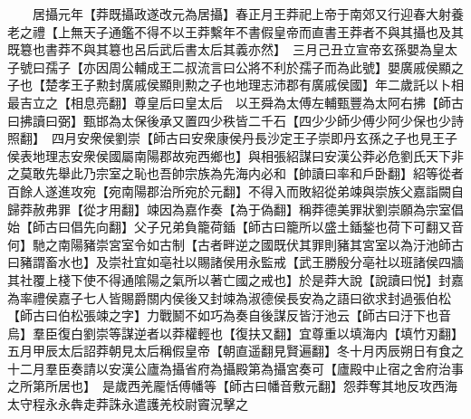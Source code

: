 　　居攝元年【莽既攝政遂改元為居攝】春正月王莽祀上帝于南郊又行迎春大射養老之禮【上無天子通鑑不得不以王莽繫年不書假皇帝而直書王莽者不與其攝也及其既簒也書莽不與其簒也呂后武后書太后其義亦然】　三月己丑立宣帝玄孫嬰為皇太子號曰孺子【亦因周公輔成王二叔流言曰公將不利於孺子而為此號】嬰廣戚侯顯之子也【楚孝王子勲封廣戚侯顯則勲之子也地理志沛郡有廣戚侯國】年二歲託以卜相最吉立之【相息亮翻】尊皇后曰皇太后　以王舜為太傅左輔甄豐為太阿右拂【師古曰拂讀曰弼】甄邯為太保後承又置四少秩皆二千石【四少少師少傅少阿少保也少詩照翻】　四月安衆侯劉崇【師古曰安衆康侯丹長沙定王子崇即丹玄孫之子也見王子侯表地理志安衆侯國屬南陽郡故宛西鄉也】與相張紹謀曰安漢公莽必危劉氏天下非之莫敢先舉此乃宗室之恥也吾帥宗族為先海内必和【帥讀曰率和戶卧翻】紹等從者百餘人遂進攻宛【宛南陽郡治所宛於元翻】不得入而敗紹從弟竦與崇族父嘉詣闕自歸莽赦弗罪【從才用翻】竦因為嘉作奏【為于偽翻】稱莽德美罪狀劉崇願為宗室倡始【師古曰倡先向翻】父子兄弟負籠荷鍤【師古曰籠所以盛土鍤鍫也荷下可翻又音何】馳之南陽豬崇宮室令如古制【古者畔逆之國既伏其罪則豬其宮室以為汙池師古曰豬謂畜水也】及崇社宜如亳社以賜諸侯用永監戒【武王勝殷分亳社以班諸侯四牆其社覆上棧下使不得通隂陽之氣所以著亡國之戒也】於是莽大說【說讀曰悦】封嘉為率禮侯嘉子七人皆賜爵關内侯後又封竦為淑德侯長安為之語曰欲求封過張伯松【師古曰伯松張竦之字】力戰鬭不如巧為奏自後謀反皆汙池云【師古曰汙下也音烏】羣臣復白劉崇等謀逆者以莽權輕也【復扶又翻】宜尊重以填海内【填竹刃翻】五月甲辰太后詔莽朝見太后稱假皇帝【朝直遥翻見賢遍翻】冬十月丙辰朔日有食之　十二月羣臣奏請以安漢公廬為攝省府為攝殿第為攝宮奏可【廬殿中止宿之舍府治事之所第所居也】　是歲西羌龎恬傅幡等【師古曰幡音敷元翻】怨莽奪其地反攻西海太守程永永犇走莽誅永遣護羌校尉竇況擊之

